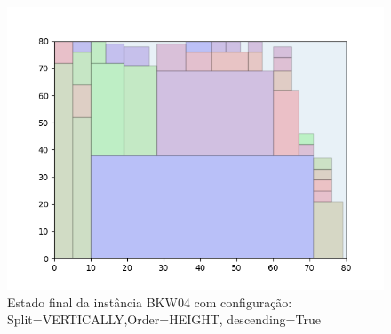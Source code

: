 \begin{figure}[H]
    \centering
    \caption[]{Estado final da instância BKW04 com configuração: Split=VERTICALLY,Order=HEIGHT, descending=True}
    \label{fig:bkw04-vertically-height-true}
    \includegraphics[scale=0.5]{output/figures/bkw/bkw04/vertically/height/true/00}
\end{figure}